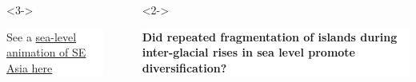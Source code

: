 {
\begin{frame}
    \begin{columns}

        \vspace{6.5cm}

        \begin{uncoverenv}<3->
        \colorbox{white}{
            \begin{minipage}[t]{0.6\textwidth}
                \raggedright
                See a
                \href{https://youtu.be/mLNLRdbu5W8}{sea-level animation of SE Asia here}
            \end{minipage}
        }
        \end{uncoverenv}

        \ \\


        \vspace{-2cm}

        \begin{uncoverenv}<2->
        \colorbox{white}{
            \begin{minipage}[t]{1.0\textwidth}
                \raggedright
                \textbf{Did repeated fragmentation of islands during
                    inter-glacial rises in sea level promote diversification?}
            \end{minipage}
        }
        \end{uncoverenv}
    \end{columns}
\end{frame}
}
